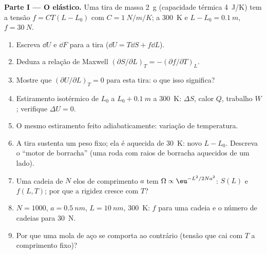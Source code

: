 \begin{problem}\label{pb:b2:thermodynamic-potentials:1}
\textbf{Parte I --- O elástico.}
Uma tira de massa \qty{2}{g} (capacidade térmica \qty{4}{J/K}) tem a tensão
$f = CT(L - L_0)$ com $C = \qty{1}{N/m/K}$; a \qty{300}{K} e $L - L_0 =
\qty{0.1}{m}$, $f = \qty{30}{N}$.
\begin{enumerate}
  \item Escreva $\dd U$ e $\dd F$ para a tira ($\dd U = T\dd S + f\dd L$).
  \item Deduza a relação de Maxwell $(\partial S/\partial L)_T = -(\partial
        f/\partial T)_L$.
  \item Mostre que $(\partial U/\partial L)_T = 0$ para esta tira: o que isso
        significa?
  \item Estiramento isotérmico de $L_0$ a $L_0 + \qty{0.1}{m}$ a
        \qty{300}{K}: $\Delta S$, calor $Q$, trabalho $W$; verifique $\Delta U = 0$.
  \item O mesmo estiramento feito adiabaticamente: variação de temperatura.
  \item A tira sustenta um peso fixo; ela é aquecida de \qty{30}{K}: novo
        $L - L_0$. Descreva o ``motor de borracha'' (uma roda com raios
        de borracha aquecidos de um lado).
  \item Uma cadeia de $N$ elos de comprimento $a$ tem $\Omega \propto \eu^{-L^2/2Na^2}$:
        $S(L)$ e $f(L,T)$; por que a rigidez cresce com $T$?
  \item $N = 1000$, $a = \qty{0.5}{nm}$, $L = \qty{10}{nm}$, \qty{300}{K}: $f$
        para uma cadeia e o número de cadeias para \qty{30}{N}.
  \item Por que uma mola de aço se comporta ao contrário (tensão que cai
        com $T$ a comprimento fixo)?
\end{enumerate}


\end{problem}
